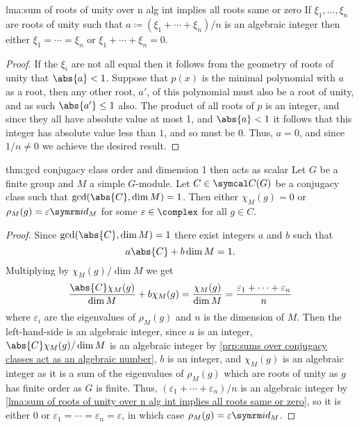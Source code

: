 \begin{lma}{}{lma:sum of roots of unity over n alg int implies all roots same or zero}
    If \(\xi_1, \dotsc, \xi_n\) are roots of unity such that \(a \coloneq (\xi_1 + \dotsb + \xi_n)/n\) is an algebraic integer then either \(\xi_1 = \dotsb = \xi_n\) or \(\xi_1 + \dotsb + \xi_n = 0\).
    \begin{proof}
        If the \(\xi_i\) are not all equal then it follows from the geometry of roots of unity that \(\abs{a} < 1\).
        Suppose that \(p(x)\) is the minimal polynomial with \(a\) as a root, then any other root, \(a'\), of this polynomial must also be a root of unity, and as such \(\abs{a'} \le 1\) also.
        The product of all roots of \(p\) is an integer, and since they all have absolute value at most 1, and \(\abs{a} < 1\) it follows that this integer has absolute value less than \(1\), and so must be \(0\).
        Thus, \(a = 0\), and since \(1/n \ne 0\) we achieve the desired result.
    \end{proof}
\end{lma}

\begin{thm}{}{thm:gcd conjugacy class order and dimension 1 then acts as scalar}
    Let \(G\) be a finite group and \(M\) a simple \(G\)-module.
    Let \(C \in \conjugacyClasses(G)\) be a conjugacy class such that \(\gcd(\abs{C}, \dim M) = 1\).
    Then either \(\chi_M(g) = 0\) or \(\rho_M(g) = \varepsilon\id_M\) for some \(\varepsilon \in \complex\) for all \(g \in C\).
    \begin{proof}
        Since \(\gcd(\abs{C}, \dim M) = 1\) there exist integers \(a\) and \(b\) such that
        \begin{equation}
            a \abs{C} + b \dim M = 1.
        \end{equation}
        Multiplying by \(\chi_M(g)/\dim M\) we get
        \begin{equation}
            \frac{\abs{C}\chi_M(g)}{\dim M} + b \chi_M(g) = \frac{\chi_M(g)}{\dim M} = \frac{\varepsilon_1 + \dotsb + \varepsilon_n}{n}
        \end{equation}
        where \(\varepsilon_i\) are the eigenvalues of \(\rho_M(g)\) and \(n\) is the dimension of \(M\).
        Then the left-hand-side is an algebraic integer, since \(a\) is an integer, \(\abs{C}\chi_M(g)/\dim M\) is an algebraic integer by \cref{prp:sums over conjugacy classes act as an algebraic number}, \(b\) is an integer, and \(\chi_M(g)\) is an algebraic integer as it is a sum of the eigenvalues of \(\rho_M(g)\) which are roots of unity as \(g\) has finite order as \(G\) is finite.
        Thus, \((\varepsilon_1 + \dotsb + \varepsilon_n)/n\) is an algebraic integer by \cref{lma:sum of roots of unity over n alg int implies all roots same or zero}, so it is either \(0\) or \(\varepsilon_1 = \dotsb = \varepsilon_n = \varepsilon\), in which case \(\rho_M(g) = \varepsilon \id_M\).
    \end{proof}
\end{thm}

